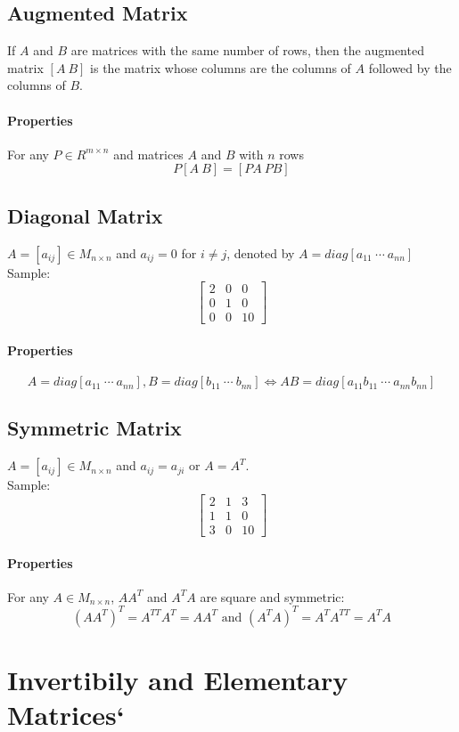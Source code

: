 \documentclass[12pt]{article}
\begin{document}
\subsection{Augmented Matrix}
If $A$ and $B$ are matrices with the same number of rows, then the augmented matrix $[A\ B]$ is the matrix whose columns are the columns of $A$ followed by the columns of $B$.
\paragraph{Properties}
For any $P \in R^{m\times n}$ and matrices $A$ and $B$ with $n$ rows
$$
P[A\ B]=[PA\ PB]
$$
\subsection{Diagonal Matrix}
$A=[a_{ij}]\in M_{n\times n}$ and $a_{ij}=0$ for $i\neq j$, denoted by $A=diag[a_{11}\ \cdots\ a_{nn}]$\\
Sample:\\
\begin{equation}
\left[
\begin{array}{ccc}
2 & 0 & 0\\
0 & 1 & 0\\
0 & 0 & 10
\end{array}
\right]
\end{equation}
\paragraph{Properties}
$$
A=diag[a_{11}\ \cdots\ a_{nn}], B=diag[b_{11}\ \cdots\ b_{nn}] \Leftrightarrow AB=diag[a_{11}b_{11}\ \cdots\ a_{nn}b_{nn}]
$$
\subsection{Symmetric Matrix}
$A=[a_{ij}]\in M_{n\times n}$ and $a_{ij}=a_{ji}$ or $A=A^T$.\\
Sample:\\
\begin{equation}
\left[
\begin{array}{ccc}
2 & 1 & 3\\
1 & 1 & 0\\
3 & 0 & 10
\end{array}
\right]
\end{equation}
\paragraph{Properties}
For any $A\in M_{n\times n}$, $AA^T$ and $A^TA$ are square and symmetric:
$$
(AA^T)^T = A^{TT}A^T = AA^T \text{ and } (A^TA)^T = A^TA^{TT} = A^TA
$$

\section{Invertibily and Elementary Matrices`}
\end{document}
